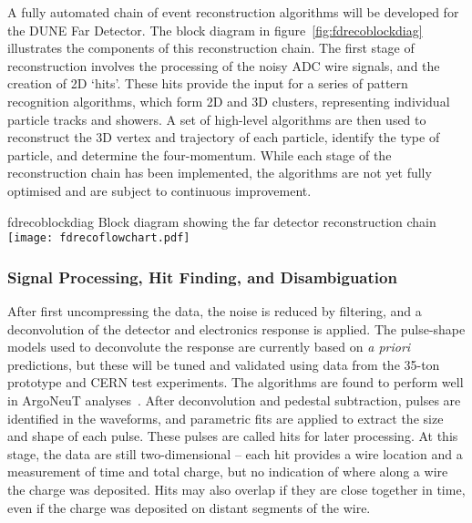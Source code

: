 
A fully automated chain of event reconstruction algorithms
will be developed for the DUNE Far Detector.
The block diagram in figure~\ref{fig:fdrecoblockdiag} illustrates 
the components of this reconstruction chain.
The first stage of reconstruction involves the processing of the
noisy ADC wire signals, and the creation of 2D `hits'. 
These hits provide the input for a series of pattern recognition algorithms,
which form 2D and 3D clusters, representing individual particle tracks and showers.
A set of high-level algorithms are then used to reconstruct the 
3D vertex and trajectory of each particle, identify the type of particle,
and determine the four-momentum.
While each stage of the reconstruction chain has been implemented,
the algorithms are not yet fully optimised and are subject to
continuous improvement.

\begin{cdrfigure}{fdrecoblockdiag}
{Block diagram showing the far detector reconstruction chain}
\texttt{[image: fdrecoflowchart.pdf]}
\end{cdrfigure}


\subsubsection{Signal Processing, Hit Finding, and Disambiguation}

After first uncompressing the data, the noise is reduced by filtering,
and a deconvolution of the detector and electronics response is applied.
The pulse-shape models used to deconvolute the response are currently
based on {\it a priori} predictions, but these will be tuned and
validated using data from the 35-ton prototype and CERN test experiments.
The algorithms are found to perform well in ArgoNeuT analyses~\cite{Anderson:2012vc}.
After deconvolution and pedestal subtraction, pulses are identified in
the waveforms, and parametric fits are applied to extract the size and
shape of each pulse. These pulses are called hits for later processing.
At this stage, the data are still two-dimensional -- each hit provides
a wire location and a measurement of time and total charge,
but no indication of where along a wire the charge was deposited.
Hits may also overlap if they are close together in time, 
even if the charge was deposited on distant segments of the wire.

